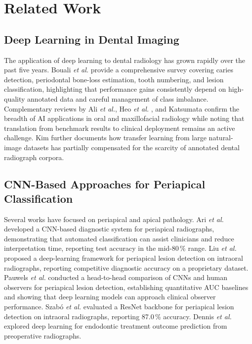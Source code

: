 \documentclass[conference]{IEEEtran}
\newcommand{\etal}{\textit{et al.}\xspace}
\begin{document}
\section{Related Work}
\label{sec:related}

\subsection{Deep Learning in Dental Imaging}

The application of deep learning to dental radiology has grown rapidly over the
past five years. Bouali \etal \cite{bouali2024} provide a comprehensive survey
covering caries detection, periodontal bone-loss estimation, tooth numbering,
and lesion classification, highlighting that performance gains consistently
depend on high-quality annotated data and careful management of class
imbalance. Complementary reviews by Ali \etal \cite{ali2025}, Heo \etal
\cite{heo2021}, and Katsumata \cite{katsumata2023} confirm the breadth of AI
applications in oral and maxillofacial radiology while noting that translation
from benchmark results to clinical deployment remains an active challenge.
Kim \cite{kim2024} further documents how transfer learning from large natural-
image datasets has partially compensated for the scarcity of annotated dental
radiograph corpora.

\subsection{CNN-Based Approaches for Periapical Classification}

Several works have focused on periapical and apical pathology.
Ari \etal \cite{ari2022} developed a CNN-based diagnostic system for periapical
radiographs, demonstrating that automated classification can assist clinicians
and reduce interpretation time, reporting test accuracy in the mid-80\,\%
range. Liu \etal \cite{liu2024} proposed a deep-learning framework for
periapical lesion detection on intraoral radiographs, reporting competitive
diagnostic accuracy on a proprietary dataset.
Pauwels \etal \cite{pauwels2021} conducted a head-to-head comparison of CNNs
and human observers for periapical lesion detection, establishing quantitative
AUC baselines and showing that deep learning models can approach clinical
observer performance.
Szab\'{o} \etal \cite{szabo2025} evaluated a ResNet backbone for periapical
lesion detection on intraoral radiographs, reporting 87.0\,\% accuracy.
Dennis \etal \cite{dennis2024} explored deep learning for endodontic treatment
outcome prediction from preoperative radiographs.
\end{document}
